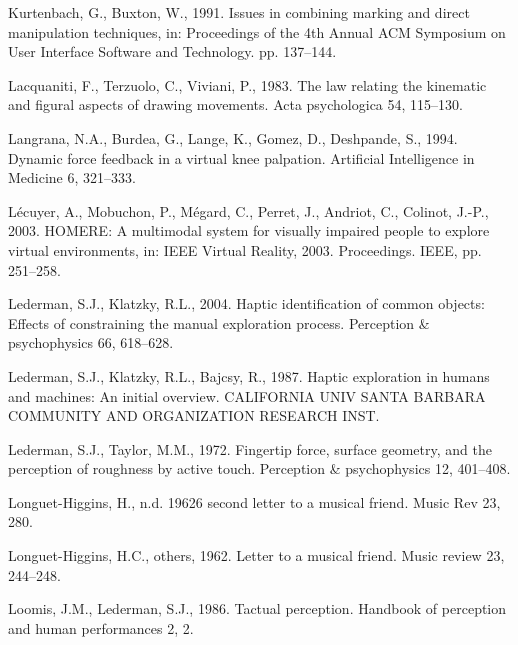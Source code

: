 \documentclass[
]{book}
\newlength{\cslhangindent}
\newlength{\cslentryspacingunit} %
\newenvironment{CSLReferences}[2] %
 {%
  \setlength{\parindent}{0pt}
  \ifodd #1
  \let\oldpar\par
  \def\par{\hangindent=\cslhangindent\oldpar}
  \fi
  \setlength{\parskip}{#2\cslentryspacingunit}
 }%
 {}
\begin{document}
\begin{CSLReferences}{1}{0}
\leavevmode{}%
Kurtenbach, G., Buxton, W., 1991. Issues in combining marking and direct manipulation techniques, in: Proceedings of the 4th Annual ACM Symposium on User Interface Software and Technology. pp. 137--144.

\leavevmode{}%
Lacquaniti, F., Terzuolo, C., Viviani, P., 1983. The law relating the kinematic and figural aspects of drawing movements. Acta psychologica 54, 115--130.

\leavevmode{}%
Langrana, N.A., Burdea, G., Lange, K., Gomez, D., Deshpande, S., 1994. Dynamic force feedback in a virtual knee palpation. Artificial Intelligence in Medicine 6, 321--333.

\leavevmode{}%
Lécuyer, A., Mobuchon, P., Mégard, C., Perret, J., Andriot, C., Colinot, J.-P., 2003. HOMERE: A multimodal system for visually impaired people to explore virtual environments, in: IEEE Virtual Reality, 2003. Proceedings. IEEE, pp. 251--258.

\leavevmode{}%
Lederman, S.J., Klatzky, R.L., 2004. Haptic identification of common objects: Effects of constraining the manual exploration process. Perception \& psychophysics 66, 618--628.

\leavevmode{}%
Lederman, S.J., Klatzky, R.L., Bajcsy, R., 1987. Haptic exploration in humans and machines: An initial overview. CALIFORNIA UNIV SANTA BARBARA COMMUNITY AND ORGANIZATION RESEARCH INST.

\leavevmode{}%
Lederman, S.J., Taylor, M.M., 1972. Fingertip force, surface geometry, and the perception of roughness by active touch. Perception \& psychophysics 12, 401--408.

\leavevmode{}%
Longuet-Higgins, H., n.d. 19626 second letter to a musical friend. Music Rev 23, 280.

\leavevmode{}%
Longuet-Higgins, H.C., others, 1962. Letter to a musical friend. Music review 23, 244--248.

\leavevmode{}%
Loomis, J.M., Lederman, S.J., 1986. Tactual perception. Handbook of perception and human performances 2, 2.


\end{CSLReferences}
\end{document}
